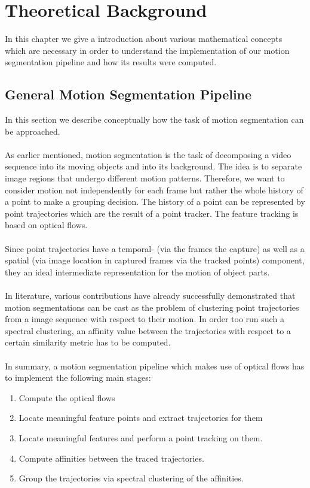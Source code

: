 \chapter{Theoretical Background}
In this chapter we give a introduction about various mathematical concepts which are necessary in order to understand the implementation of our motion segmentation pipeline and how its results were computed. 

\section{General Motion Segmentation Pipeline}
In this section we describe conceptually how the task of motion segmentation can be approached. \\ \\
As earlier mentioned, motion segmentation is the task of decomposing a video sequence into its moving objects and into its background. The idea is to separate image regions that undergo different motion patterns. Therefore, we want to consider motion not independently for each frame but rather the whole history of a point to make a grouping decision. The history of a point can be represented by point trajectories which are the result of a point tracker. The feature tracking is based on optical flows. \\ \\
Since point trajectories have a temporal- (via the frames the capture) as well as a spatial (via image location in captured frames via the tracked points) component, they an ideal intermediate representation for the motion of object parts. \\ \\
In literature, various contributions have already successfully demonstrated that motion segmentations can be cast as the problem of clustering point trajectories from a image sequence with respect to their motion. In order too run such a spectral clustering, an affinity value between the trajectories with respect to a certain similarity metric has to be computed. \\ \\
In summary, a motion segmentation pipeline which makes use of optical flows has to implement the following main stages:
\begin{enumerate}
	\item Compute the optical flows 
	\item Locate meaningful feature points and extract trajectories for them
	\item Locate meaningful features and perform a point tracking on them.
	\item Compute affinities between the traced trajectories.
	\item Group the trajectories via spectral clustering of the affinities.
\end{enumerate}
